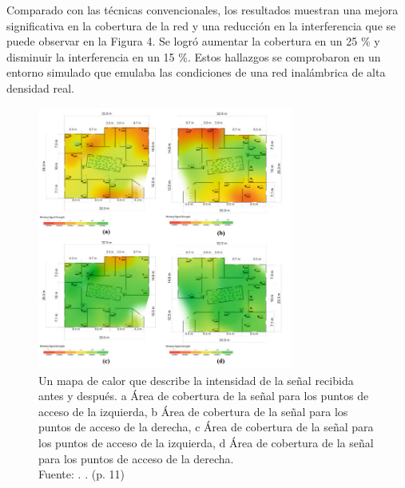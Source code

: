 Comparado con las técnicas convencionales, los resultados muestran una mejora significativa en la cobertura de la red y una reducción en la interferencia que se puede observar en la Figura 4. Se logró aumentar la cobertura en un 25 \% y disminuir la interferencia en un 15 \%. Estos hallazgos se comprobaron en un entorno simulado que emulaba las condiciones de una red inalámbrica de alta densidad real.

\begin{figure}[!ht]
	\begin{center}
		\includegraphics[width=0.75\textwidth]{2/figures/alathari2023.png}
		\caption[Un mapa de calor que describe la intensidad de la señal recibida antes y después. a Área de cobertura de la señal para los puntos de acceso de la izquierda, b Área de cobertura de la señal para los puntos de acceso de la derecha, c Área de cobertura de la señal para los puntos de acceso de la izquierda, d Área de cobertura de la señal para los puntos de acceso de la derecha.]{Un mapa de calor que describe la intensidad de la señal recibida antes y después. a Área de cobertura de la señal para los puntos de acceso de la izquierda, b Área de cobertura de la señal para los puntos de acceso de la derecha, c Área de cobertura de la señal para los puntos de acceso de la izquierda, d Área de cobertura de la señal para los puntos de acceso de la derecha.\\
		Fuente: \cite{pr_alathari2023optaps}. . (p. 11)}
		\label{2:fig112}
	\end{center}
\end{figure}

